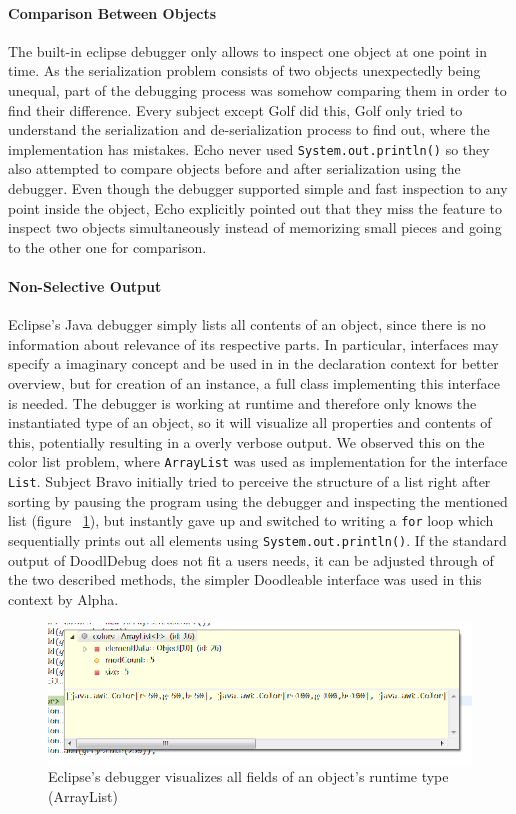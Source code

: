 \documentclass[english]{acm_proc_article-sp}
\newcommand{\nb}[2]{\nbc{#1}{#2}{orange}}
\newcommand\todo[1]{\nb{TO DO}{#1}}
\begin{document}
\paragraph{Comparison Between Objects}
The built-in eclipse debugger only allows to inspect one object at one point in time. As the serialization problem consists of two objects unexpectedly  being unequal, part of the debugging process was somehow comparing them in order to find their difference. Every subject except Golf did this, Golf only tried to understand the serialization and de-serialization process to find out, where the implementation has mistakes. Echo never used \verb-System.out.println()- so they also attempted to compare objects before and after serialization using the debugger. Even though the debugger supported simple and fast inspection to any point inside the object, Echo explicitly pointed out that they miss the feature to inspect two objects simultaneously instead of memorizing small pieces and going to the other one for comparison.

\paragraph{Non-Selective Output}
Eclipse's Java debugger simply lists all contents of an object, since there is no information about relevance of its respective parts. In particular, interfaces may specify a imaginary concept and be used in in the declaration context for better overview, but for creation of an instance, a full class implementing this interface is needed. The debugger is working at runtime and therefore only knows the instantiated type of an object, so it will visualize all properties and contents of this, potentially resulting in a overly verbose output. We observed this on the color list problem, where \verb.ArrayList. was used as implementation for the interface \verb.List.. Subject Bravo initially tried to perceive the structure of a list right after sorting by pausing the program  using the debugger and inspecting the mentioned list (figure ~\ref{debugger_color-list}), but instantly gave up and switched to writing a \verb.for. loop which sequentially prints out all elements using \verb-System.out.println()-. If the standard output of DoodlDebug does not fit a users needs, it can be adjusted through of the two described methods, the simpler Doodleable interface was used in this context by Alpha. \todo{Screenshot of Doodleable usage}
\begin{figure}[h]
	\includegraphics[width=\linewidth]{img/debugger_color-list_remo.png}
	\caption[Bravo using the debugger for a color list]{Eclipse's debugger visualizes all fields of an object's runtime type (ArrayList)}
	\label{debugger_color-list}
\end{figure}
\end{document}
